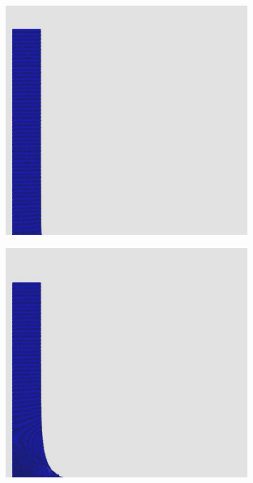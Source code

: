 \documentclass[12pt,a4paper,dvipsnames]{article}
\begin{document}
\begin{figure}[!ht] \centering
	\begin{subfigure}[!h]{0.3\textwidth} \centering
		\includegraphics[width=\textwidth]{DB/DB-000.jpg}
	\end{subfigure}
    \begin{subfigure}[!h]{0.3\textwidth} \centering
		\includegraphics[width=\textwidth]{DB/DB-001.jpg}

\end{subfigure}
\end{figure}
\end{document}
